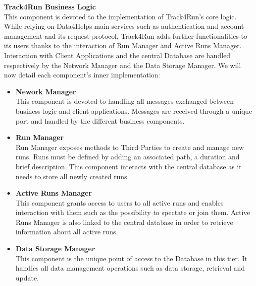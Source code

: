 \documentclass[titlepage]{article}
\begin{document}
{\bf Track4Run Business Logic }\\ 
This component is devoted to the implementation of Track4Run’s core logic. While relying on Data4Helps main services such as authentication and account management and its request protocol, Track4Run adds further functionalities to its users thanks to the interaction of Run Manager and Active Runs Manager. 
Interaction with Client Applications and the central Database are handled respectively by the Network Manager and the Data Storage Manager.
We will now detail each component’s inner implementation:
\begin{itemize}
        \item {\bf Nework Manager }\\
        This component is devoted to handling all messages exchanged between business logic and client applications. Messages are received through a unique port and handled by the different business components.
		\item {\bf Run Manager }\\
		Run Manager exposes methods to Third Parties  to create and manage new runs. Runs must be defined by adding an associated path, a duration and brief description. This component interacts with the central database as it needs to store all newly created runs.
		\item {\bf Active Runs Manager }\\
		This component grants access to users to all active runs and enables interaction with them such as the possibility to spectate or join them. Active Runs Manager is also linked to the central database in order to retrieve information about all active runs.
		\item {\bf Data Storage Manager }\\
		This component is the unique point of access to the Database in this tier. It handles all data management operations such as data storage, retrieval and update.\\
    \end{itemize}
\end{document}
